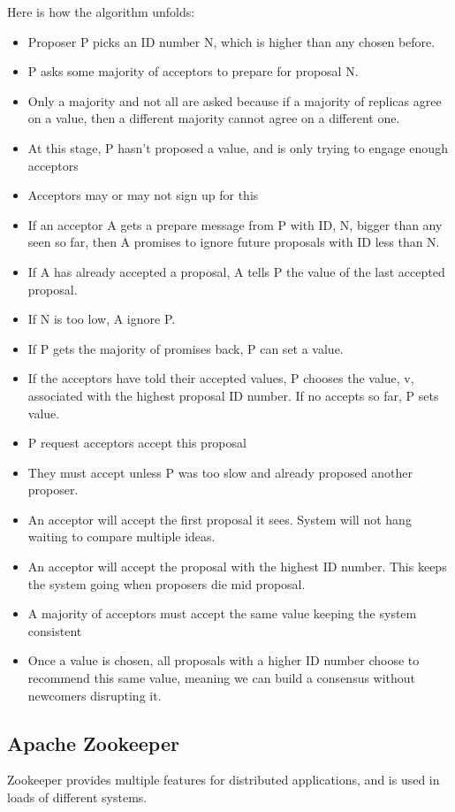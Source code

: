\documentclass[11pt,a4paper,titlepage,dvipsnames,cmyk]{scrartcl}
\begin{document}
Here is how the algorithm unfolds:
\begin{itemize}
    \item Proposer P picks an ID number N, which is higher than any chosen before.
    \item P asks some majority of acceptors to prepare for proposal N.
    \item Only a majority and not all are asked because if a majority of replicas agree on a value, then a different majority cannot agree on a different one.
    \item At this stage, P hasn't proposed a value, and is only trying to engage enough acceptors
    \item Acceptors may or may not sign up for this
    \item If an acceptor A gets a prepare message from P with ID, N, bigger than any seen so far, then A promises to ignore future proposals with ID less than N.
    \item If A has already accepted a proposal, A tells P the value of the last accepted proposal.
    \item If N is too low, A ignore P.
    \item If P gets the majority of promises back, P can set a value.
    \item If the acceptors have told their accepted values, P chooses the value, v, associated with the highest proposal ID number. If no accepts so far, P sets value.
    \item P request acceptors accept this proposal
    \item They must accept unless P was too slow and already proposed another proposer.
    \item An acceptor will accept the first proposal it sees. System will not hang waiting to compare multiple ideas.
    \item An acceptor will accept the proposal with the highest ID number. This keeps the system going when proposers die mid proposal.
    \item A majority of acceptors must accept the same value keeping the system consistent
    \item Once a value is chosen, all proposals with a higher ID number choose to recommend this same value, meaning we can build a consensus without newcomers disrupting it.
\end{itemize}

\subsection{Apache Zookeeper}
Zookeeper provides multiple features for distributed applications, and is used in loads of different systems.
\end{document}
